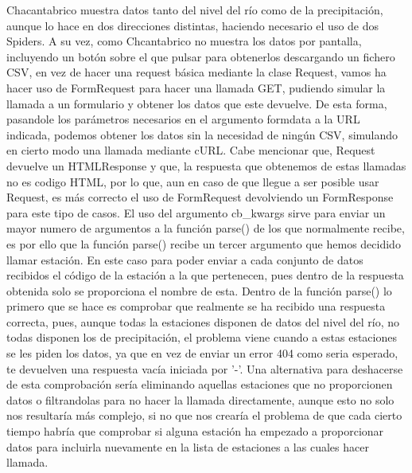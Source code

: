 Chacantabrico muestra datos tanto del nivel del río como de la precipitación, aunque lo hace en dos direcciones distintas, haciendo necesario el uso de dos Spiders.\newline
A su vez, como Chcantabrico no muestra los datos por pantalla, incluyendo un botón sobre el que pulsar para obtenerlos descargando un fichero CSV, en vez de hacer una request básica mediante la clase Request, vamos ha hacer uso de FormRequest para hacer una llamada GET, pudiendo simular la llamada a un formulario y obtener los datos que este devuelve. De esta forma, pasandole los parámetros necesarios en el argumento formdata a la URL indicada, podemos obtener los datos sin la necesidad de ningún CSV, simulando en cierto modo una llamada mediante cURL. Cabe mencionar que, Request devuelve un HTMLResponse y que, la respuesta que obtenemos de estas llamadas no es codigo HTML, por lo que, aun en caso de que llegue a ser posible usar Request, es más correcto el uso de FormRequest devolviendo un FormResponse para este tipo de casos.\newline
El uso del argumento cb\_kwargs sirve para enviar un mayor numero de argumentos a la función parse() de los que normalmente recibe, es por ello que la función parse() recibe un tercer argumento que hemos decidido llamar estación. En este caso para poder enviar a cada conjunto de datos recibidos el código de la estación a la que pertenecen, pues dentro de la respuesta obtenida solo se proporciona el nombre de esta.\newline
Dentro de la función parse() lo primero que se hace es comprobar que realmente se ha recibido una respuesta correcta, pues, aunque todas la estaciones disponen de datos del nivel del río, no todas disponen los de precipitación, el problema viene cuando a estas estaciones se les piden los datos, ya que en vez de enviar un error 404 como seria esperado, te devuelven una respuesta vacía iniciada por '-'. Una alternativa para deshacerse de esta comprobación sería eliminando aquellas estaciones que no proporcionen datos o filtrandolas para no hacer la llamada directamente, aunque esto no solo nos resultaría más complejo, si no que nos crearía el problema de que cada cierto tiempo habría que comprobar si alguna estación ha empezado a proporcionar datos para incluirla nuevamente en la lista de estaciones a las cuales hacer llamada.

